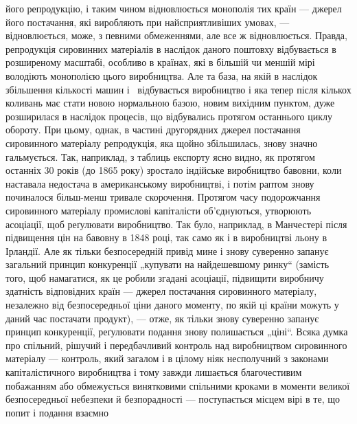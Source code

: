 \parcont{}  %
його репродукцію, і таким чином відновлюється монополія тих
країн — джерел його постачання, які виробляють при найсприятливіших
умовах, — відновлюється, може, з певними обмеженнями,
але все ж відновлюється. Правда, репродукція сировинних
матеріалів в наслідок даного поштовху відбувається в розширеному
масштабі, особливо в країнах, які в більшій чи меншій мірі
володіють монополією цього виробництва. Але та база, на якій в наслідок
збільшення кількості машин і~ відбувається виробництво
і яка тепер після кількох коливань має стати новою нормальною
базою, новим вихідним пунктом, дуже розширилася в наслідок
процесів, що відбувались протягом останнього циклу обороту.
При цьому, однак, в частині другорядних джерел постачання
сировинного матеріалу репродукція, яка щойно збільшилась, знову
значно гальмується. Так, наприклад, з таблиць експорту ясно
видно, як протягом останніх 30 років (до 1865 року) зростало
індійське виробництво бавовни, коли наставала недостача в американському
виробництві, і потім раптом знову починалося
більш-менш тривале скорочення. Протягом часу подорожчання
сировинного матеріалу промислові капіталісти об’єднуються,
утворюють асоціації, щоб реґулювати виробництво. Так було,
наприклад, в Манчестері після підвищення цін на бавовну в
1848 році, так само як і в виробництві льону в Ірландії. Але як
тільки безпосередній привід мине і знову суверенно запанує загальний
принцип конкуренції „купувати на найдешевшому ринку“
(замість того, щоб намагатися, як це робили згадані асоціації,
підвищити виробничу здатність відповідних країн — джерел постачання
сировинного матеріалу, незалежно від безпосередньої
ціни даного моменту, по якій ці країни можуть у даний час постачати
продукт), — отже, як тільки знову суверенно запанує
принцип конкуренції, реґулювати подання знову полишається
„ціні“. Всяка думка про спільний, рішучий і передбачливий контроль
над виробництвом сировинного матеріалу — контроль,
який загалом і в цілому ніяк несполучний з законами капіталістичного
виробництва і тому завжди лишається благочестивим
побажанням або обмежується винятковими спільними кроками
в моменти великої безпосередньої небезпеки й безпорадності —
поступається місцем вірі в те, що попит і подання взаємно

